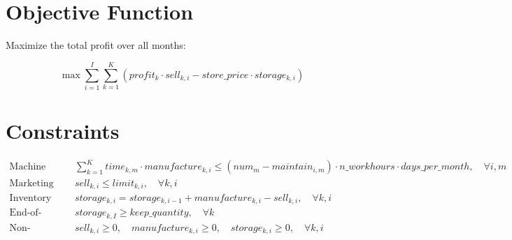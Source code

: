 \documentclass{article}
\begin{document}
\section*{Objective Function}
Maximize the total profit over all months:

\[
\max \sum_{i=1}^{I} \sum_{k=1}^{K} \left( profit_{k} \cdot sell_{k, i} - store\_price \cdot storage_{k, i} \right)
\]

\section*{Constraints}
\begin{align}
    \text{Machine capacity: } & \sum_{k=1}^{K} time_{k, m} \cdot manufacture_{k, i} \leq \left(num_{m} - maintain_{i, m}\right) \cdot n\_workhours \cdot days\_per\_month, \quad \forall i, m \\
    \text{Marketing limitations: } & sell_{k, i} \leq limit_{k, i}, \quad \forall k, i \\
    \text{Inventory balance: } & storage_{k, i} = storage_{k, i-1} + manufacture_{k, i} - sell_{k, i}, \quad \forall k, i \\
    \text{End-of-period stock requirement: } & storage_{k, I} \geq keep\_quantity, \quad \forall k \\
    \text{Non-negativity: } & sell_{k, i} \geq 0, \quad manufacture_{k, i} \geq 0, \quad storage_{k, i} \geq 0, \quad \forall k, i
\end{align}
\end{document}
